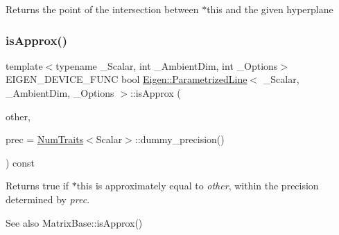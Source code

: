 \begin{DoxyReturn}{Returns}
the point of the intersection between {\ttfamily $\ast$this} and the given hyperplane 
\end{DoxyReturn}
\mbox{\label{class_eigen_1_1_parametrized_line_a27a86c54f66a622847470f79aec4ea2f}} 
\subsubsection{\texorpdfstring{isApprox()}{isApprox()}}
{\footnotesize\ttfamily template$<$typename \+\_\+\+Scalar, int \+\_\+\+Ambient\+Dim, int \+\_\+\+Options$>$ \\
E\+I\+G\+E\+N\+\_\+\+D\+E\+V\+I\+C\+E\+\_\+\+F\+U\+NC bool \mbox{\hyperlink{class_eigen_1_1_parametrized_line}{Eigen\+::\+Parametrized\+Line}}$<$ \+\_\+\+Scalar, \+\_\+\+Ambient\+Dim, \+\_\+\+Options $>$\+::is\+Approx (\begin{DoxyParamCaption}\item[{const \mbox{\hyperlink{class_eigen_1_1_parametrized_line}{Parametrized\+Line}}$<$ \+\_\+\+Scalar, \+\_\+\+Ambient\+Dim, \+\_\+\+Options $>$ \&}]{other,  }\item[{const typename \mbox{\hyperlink{struct_eigen_1_1_num_traits}{Num\+Traits}}$<$ Scalar $>$\+::Real \&}]{prec = {\ttfamily \mbox{\hyperlink{struct_eigen_1_1_num_traits}{Num\+Traits}}$<$Scalar$>$\+:\+:dummy\+\_\+precision()} }\end{DoxyParamCaption}) const\hspace{0.3cm}{\ttfamily [inline]}}

\begin{DoxyReturn}{Returns}
{\ttfamily true} if {\ttfamily $\ast$this} is approximately equal to {\itshape other}, within the precision determined by {\itshape prec}.
\end{DoxyReturn}
\begin{DoxySeeAlso}{See also}
Matrix\+Base\+::is\+Approx() 
\end{DoxySeeAlso}
\mbox{\label{class_eigen_1_1_parametrized_line_ae0a510cc78156974ab5a7fb8a6b2326a}} 
